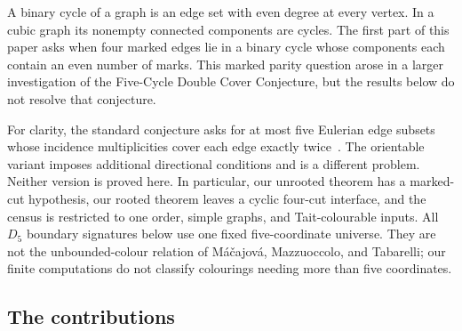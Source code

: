 \documentclass[11pt]{article}
\theoremstyle{definition}
\theoremstyle{remark}
\begin{document}
A binary cycle of a graph is an edge set with even degree at every
vertex.  In a cubic graph its nonempty connected components are cycles.
The first part of this paper asks when four marked edges lie in a binary
cycle whose components each contain an even number of marks.  This
marked parity question arose in a larger investigation of the
Five-Cycle Double Cover Conjecture, but the results below do not resolve
that conjecture.

For clarity, the standard conjecture asks for at most five Eulerian
edge subsets whose incidence multiplicities cover each edge exactly
twice~\cite{Zhang2012,Oum2026}.  The orientable variant imposes additional directional
conditions and is a different problem.  Neither version is proved here.
In particular, our unrooted theorem has a marked-cut hypothesis, our
rooted theorem leaves a cyclic four-cut interface, and the census is
restricted to one order, simple graphs, and Tait-colourable inputs.
All \(D_5\) boundary signatures below use one fixed five-coordinate
universe.  They are not the unbounded-colour relation of
M\'a\v cajov\'a, Mazzuoccolo, and Tabarelli; our finite computations do
not classify colourings needing more than five coordinates.

\subsection*{The contributions}
\end{document}
